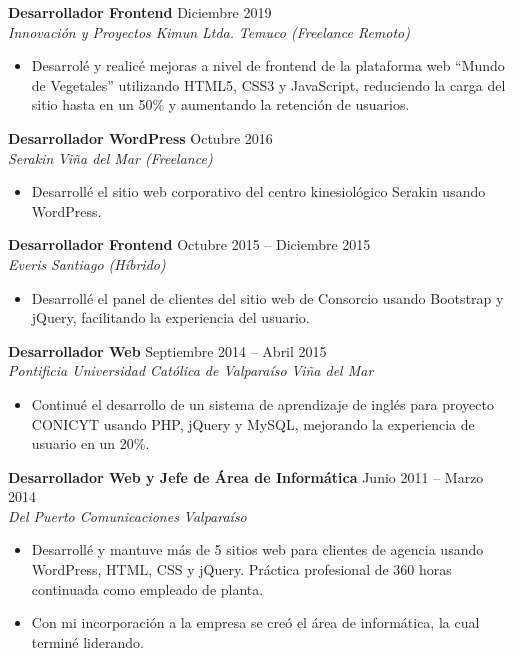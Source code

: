 \documentclass[11pt,a4paper]{article}
\newcommand{\job}[4]{%
    \textbf{#1} \hfill #2\\
    \textit{#3} \hfill \textit{#4}\\[2pt]
}
\begin{document}
\job{Desarrollador Frontend}{Diciembre 2019}{Innovación y Proyectos Kimun Ltda.}{Temuco (Freelance Remoto)}
\begin{itemize}[leftmargin=*, itemsep=1pt, topsep=2pt]
    \item Desarrolé y realicé mejoras a nivel de frontend de la plataforma web ``Mundo de Vegetales'' utilizando HTML5, CSS3 y JavaScript, reduciendo la carga del sitio hasta en un 50\% y aumentando la retención de usuarios.
\end{itemize}

\job{Desarrollador WordPress}{Octubre 2016}{Serakin}{Viña del Mar (Freelance)}
\begin{itemize}[leftmargin=*, itemsep=1pt, topsep=2pt]
    \item Desarrollé el sitio web corporativo del centro kinesiológico Serakin usando WordPress.
\end{itemize}

\job{Desarrollador Frontend}{Octubre 2015 -- Diciembre 2015}{Everis}{Santiago (Híbrido)}
\begin{itemize}[leftmargin=*, itemsep=1pt, topsep=2pt]
    \item Desarrollé el panel de clientes del sitio web de Consorcio usando Bootstrap y jQuery, facilitando la experiencia del usuario.
\end{itemize}

\job{Desarrollador Web}{Septiembre 2014 -- Abril 2015}{Pontificia Universidad Católica de Valparaíso}{Viña del Mar}
\begin{itemize}[leftmargin=*, itemsep=1pt, topsep=2pt]
    \item Continué el desarrollo de un sistema de aprendizaje de inglés para proyecto CONICYT usando PHP, jQuery y MySQL, mejorando la experiencia de usuario en un 20\%.
\end{itemize}

\job{Desarrollador Web y Jefe de Área de Informática}{Junio 2011 -- Marzo 2014}{Del Puerto Comunicaciones}{Valparaíso}
\begin{itemize}[leftmargin=*, itemsep=1pt, topsep=2pt]
    \item Desarrollé y mantuve más de 5 sitios web para clientes de agencia usando WordPress, HTML, CSS y jQuery. Práctica profesional de 360 horas continuada como empleado de planta.
    \item Con mi incorporación a la empresa se creó el área de informática, la cual terminé liderando.
\end{itemize}
\end{document}
